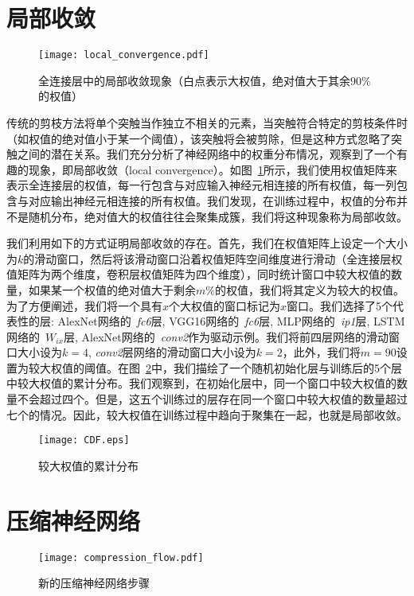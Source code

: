 \section{局部收敛}

\begin{figure}[h]
  \centering
  \texttt{[image: local\_convergence.pdf]}
  \caption{全连接层中的局部收敛现象（白点表示大权值，绝对值大于其余$90\%$的权值）}
  \label{fig:local_convergence}
\end{figure}

传统的剪枝方法将单个突触当作独立不相关的元素，当突触符合特定的剪枝条件时（如权值的绝对值小于某一个阈值），该突触将会被剪除，但是这种方式忽略了突触之间的潜在关系。我们充分分析了神经网络中的权重分布情况，观察到了一个有趣的现象，即局部收敛（local convergence）。如图~\ref{fig:local_convergence}所示，我们使用权值矩阵来表示全连接层的权值，每一行包含与对应输入神经元相连接的所有权值，每一列包含与对应输出神经元相连接的所有权值。我们发现，在训练过程中，权值的分布并不是随机分布，绝对值大的权值往往会聚集成簇，我们将这种现象称为局部收敛。

我们利用如下的方式证明局部收敛的存在。首先，我们在权值矩阵上设定一个大小为$k$的滑动窗口，然后将该滑动窗口沿着权值矩阵空间维度进行滑动（全连接层权值矩阵为两个维度，卷积层权值矩阵为四个维度），同时统计窗口中较大权值的数量，如果某一个权值的绝对值大于剩余$m\%$的权值，我们将其定义为较大的权值。为了方便阐述，我们将一个具有$x$个大权值的窗口标记为$x$窗口。我们选择了5个代表性的层: AlexNet网络的~\emph{fc6}层, VGG16网络的~\emph{fc6}层, MLP网络的~\emph{ip1}层, LSTM网络的~\emph{$W_{ix}$}层, AlexNet网络的~\emph{conv2}作为驱动示例。我们将前四层网络的滑动窗口大小设为$k = 4$, \emph{conv2}层网络的滑动窗口大小设为$k = 2$，此外，我们将$m = 90$设置为较大权值的阈值。在图~\ref{fig:cdf}中，我们描绘了一个随机初始化层与训练后的5个层中较大权值的累计分布。我们观察到，在初始化层中，同一个窗口中较大权值的数量不会超过四个。但是，这五个训练过的层存在同一个窗口中较大权值的数量超过七个的情况。因此，较大权值在训练过程中趋向于聚集在一起，也就是局部收敛。

\begin{figure}[h]
\centering
\texttt{[image: CDF.eps]}
\caption{较大权值的累计分布}
\label{fig:cdf}
\end{figure}

\section{压缩神经网络}

\begin{figure}[h]
\centering
\texttt{[image: compression\_flow.pdf]}
\caption{新的压缩神经网络步骤}
\label{fig:compression_flow}
\end{figure}

